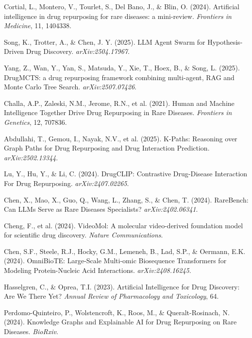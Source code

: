 \documentclass{article}
\begin{document}

\begin{thebibliography}{20}

Cortial, L., Montero, V., Tourlet, S., Del Bano, J., \& Blin, O. (2024). Artificial intelligence in drug repurposing for rare diseases: a mini-review. \emph{Frontiers in Medicine}, 11, 1404338.

Song, K., Trotter, A., \& Chen, J. Y. (2025). LLM Agent Swarm for Hypothesis-Driven Drug Discovery. \emph{arXiv:2504.17967}.

Yang, Z., Wan, Y., Yan, S., Matsuda, Y., Xie, T., Hoex, B., \& Song, L. (2025). DrugMCTS: a drug repurposing framework combining multi-agent, RAG and Monte Carlo Tree Search. \emph{arXiv:2507.07426}.

Challa, A.P., Zaleski, N.M., Jerome, R.N., et al. (2021). Human and Machine Intelligence Together Drive Drug Repurposing in Rare Diseases. \emph{Frontiers in Genetics}, 12, 707836.

Abdullahi, T., Gemou, I., Nayak, N.V., et al. (2025). K-Paths: Reasoning over Graph Paths for Drug Repurposing and Drug Interaction Prediction. \emph{arXiv:2502.13344}.

Lu, Y., Hu, Y., \& Li, C. (2024). DrugCLIP: Contrastive Drug-Disease Interaction For Drug Repurposing. \emph{arXiv:2407.02265}.

Chen, X., Mao, X., Guo, Q., Wang, L., Zhang, S., \& Chen, T. (2024). RareBench: Can LLMs Serve as Rare Diseases Specialists? \emph{arXiv:2402.06341}.

Cheng, F., et al. (2024). VideoMol: A molecular video-derived foundation model for scientific drug discovery. \emph{Nature Communications}.

Chen, S.F., Steele, R.J., Hocky, G.M., Lemeneh, B., Lad, S.P., \& Oermann, E.K. (2024). OmniBioTE: Large-Scale Multi-omic Biosequence Transformers for Modeling Protein-Nucleic Acid Interactions. \emph{arXiv:2408.16245}.

Hasselgren, C., \& Oprea, T.I. (2023). Artificial Intelligence for Drug Discovery: Are We There Yet? \emph{Annual Review of Pharmacology and Toxicology}, 64.

Perdomo-Quinteiro, P., Wolstencroft, K., Roos, M., \& Queralt-Rosinach, N. (2024). Knowledge Graphs and Explainable AI for Drug Repurposing on Rare Diseases. \emph{BioRxiv}.


\end{thebibliography}
\end{document}
